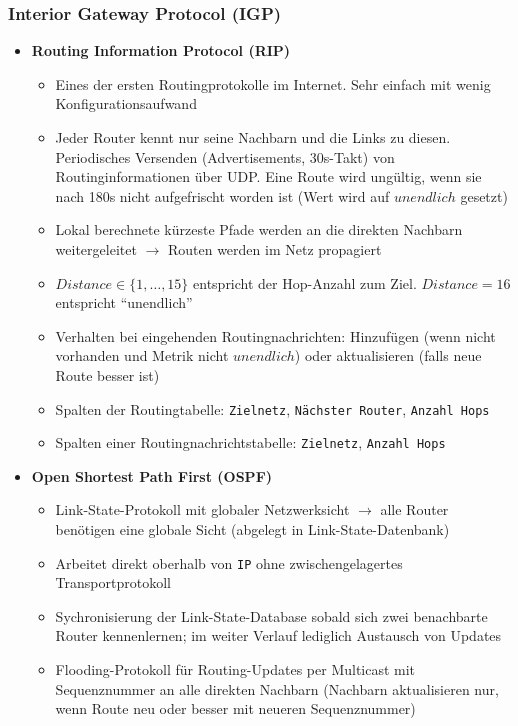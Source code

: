 \subsubsection{Interior Gateway Protocol (IGP)}
\begin{itemize}
	\item \textbf{Routing Information Protocol (RIP)}
	\begin{itemize}
		\item Eines der ersten Routingprotokolle im Internet. Sehr einfach mit wenig Konfigurationsaufwand
		\item Jeder Router kennt nur seine Nachbarn und die Links zu diesen. Periodisches Versenden (Advertisements, 30s-Takt) von Routinginformationen über UDP. Eine Route wird ungültig, wenn sie nach 180s nicht aufgefrischt worden ist (Wert wird auf \(unendlich\) gesetzt)
		\item Lokal berechnete kürzeste Pfade werden an die direkten Nachbarn weitergeleitet \(\rightarrow\) Routen werden im Netz propagiert
		\item \(Distance \in \{1,\dots,15\}\) entspricht der Hop-Anzahl zum Ziel. \(Distance=16\) entspricht "`unendlich"'
		\item Verhalten bei eingehenden Routingnachrichten: Hinzufügen (wenn nicht vorhanden und Metrik nicht \(unendlich\)) oder aktualisieren (falls neue Route besser ist)
		\item Spalten der Routingtabelle: \texttt{Zielnetz}, \texttt{Nächster Router}, \texttt{Anzahl Hops}
		\item Spalten einer Routingnachrichtstabelle: \texttt{Zielnetz}, \texttt{Anzahl Hops}
	\end{itemize}
	\item \textbf{Open Shortest Path First (OSPF)}
	\begin{itemize}
		\item Link-State-Protokoll mit globaler Netzwerksicht \(\rightarrow\) alle Router benötigen eine globale Sicht (abgelegt in Link-State-Datenbank)
		\item Arbeitet direkt oberhalb von \texttt{IP} ohne zwischengelagertes Transportprotokoll
		\item Sychronisierung der Link-State-Database sobald sich zwei benachbarte Router kennenlernen; im weiter Verlauf lediglich Austausch von Updates
		\item Flooding-Protokoll für Routing-Updates per Multicast mit Sequenznummer an alle direkten Nachbarn (Nachbarn aktualisieren nur, wenn Route neu oder besser mit neueren Sequenznummer)

\end{itemize}
\end{itemize}
